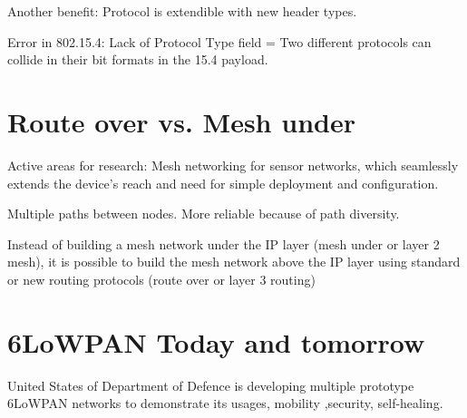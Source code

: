 \documentclass[10pt]{article}
\begin{document}
Another benefit: Protocol is extendible with new header types.

Error in 802.15.4: Lack of Protocol Type field = Two different protocols can collide in their bit formats in the 15.4 payload. 


\section{Route over vs. Mesh under}

Active areas for research: Mesh networking for sensor networks, which seamlessly extends the device's reach and need for simple deployment and configuration.

Multiple paths between nodes. More reliable because of path diversity.

Instead of building a mesh network under the IP layer (mesh under or layer 2 mesh), it is possible to build the mesh network above the IP layer using standard or new routing protocols (route over or layer 3 routing)

\section{6LoWPAN Today and tomorrow}

United States of Department of Defence is developing multiple prototype 6LoWPAN networks to demonstrate its usages, mobility ,security, self-healing.
\end{document}
